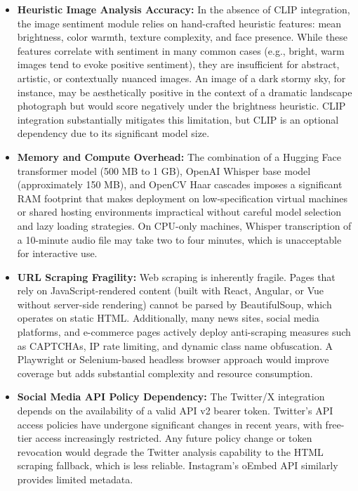 \documentclass[12pt, a4paper]{report}
\begin{document}
\begin{itemize}[noitemsep, leftmargin=1.5em]
    \item \textbf{Heuristic Image Analysis Accuracy:} In the absence of CLIP integration, the image sentiment module relies on hand-crafted heuristic features: mean brightness, color warmth, texture complexity, and face presence. While these features correlate with sentiment in many common cases (e.g., bright, warm images tend to evoke positive sentiment), they are insufficient for abstract, artistic, or contextually nuanced images. An image of a dark stormy sky, for instance, may be aesthetically positive in the context of a dramatic landscape photograph but would score negatively under the brightness heuristic. CLIP integration substantially mitigates this limitation, but CLIP is an optional dependency due to its significant model size.

    \item \textbf{Memory and Compute Overhead:} The combination of a Hugging Face transformer model (500 MB to 1 GB), OpenAI Whisper base model (approximately 150 MB), and OpenCV Haar cascades imposes a significant RAM footprint that makes deployment on low-specification virtual machines or shared hosting environments impractical without careful model selection and lazy loading strategies. On CPU-only machines, Whisper transcription of a 10-minute audio file may take two to four minutes, which is unacceptable for interactive use.

    \item \textbf{URL Scraping Fragility:} Web scraping is inherently fragile. Pages that rely on JavaScript-rendered content (built with React, Angular, or Vue without server-side rendering) cannot be parsed by BeautifulSoup, which operates on static HTML. Additionally, many news sites, social media platforms, and e-commerce pages actively deploy anti-scraping measures such as CAPTCHAs, IP rate limiting, and dynamic class name obfuscation. A Playwright or Selenium-based headless browser approach would improve coverage but adds substantial complexity and resource consumption.

    \item \textbf{Social Media API Policy Dependency:} The Twitter/X integration depends on the availability of a valid API v2 bearer token. Twitter's API access policies have undergone significant changes in recent years, with free-tier access increasingly restricted. Any future policy change or token revocation would degrade the Twitter analysis capability to the HTML scraping fallback, which is less reliable. Instagram's oEmbed API similarly provides limited metadata.


\end{itemize}
\end{document}

